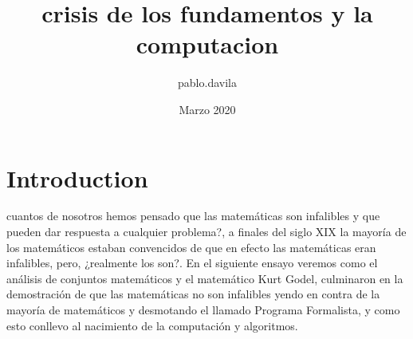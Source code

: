 \documentclass{article}
\title{crisis de los fundamentos y la computacion}
\author{pablo.davila }
\date{Marzo 2020}
\begin{document}
\maketitle

\section{Introduction}
cuantos de nosotros hemos pensado que las matemáticas son infalibles y que pueden dar respuesta a cualquier problema?, a finales del siglo XIX la mayoría de los matemáticos estaban convencidos de que en efecto las matemáticas eran infalibles, pero, ¿realmente los son?.
En el siguiente ensayo veremos como el análisis de conjuntos matemáticos y el matemático Kurt Godel, culminaron en la demostración de que las matemáticas no son infalibles yendo en contra de la mayoría de matemáticos y desmotando el llamado Programa Formalista, y como esto conllevo al nacimiento de la computación y algoritmos. 
\end{document}
